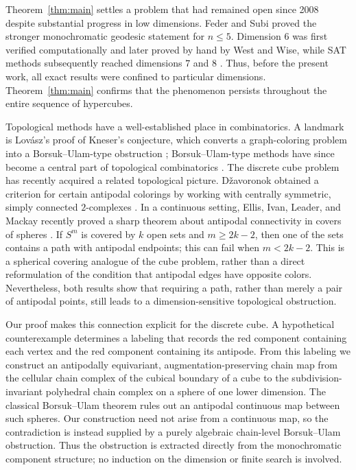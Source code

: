 \documentclass[reqno,12pt]{amsart}
\theoremstyle{definition}
\begin{document}
Theorem~\ref{thm:main} settles a problem that had remained open since
2008 despite substantial progress in low dimensions.  Feder and Subi
proved the stronger monochromatic geodesic statement for \(n\leq5\).
Dimension \(6\) was first verified computationally and later proved by
hand by West and Wise, while SAT methods subsequently reached
dimensions \(7\) and \(8\)
\cite{FederSubi,ZulkoskiEtAl,WestWise,FrankstonScheinerman,
KirchwegerEtAl}.  Thus, before the present work, all exact results were
confined to particular dimensions.  Theorem~\ref{thm:main} confirms
that the phenomenon persists throughout the entire sequence of
hypercubes.

Topological methods have a well-established place in combinatorics.  A
landmark is Lov\'asz's proof of Kneser's conjecture, which converts a
graph-coloring problem into a Borsuk--Ulam-type obstruction
\cite{Lovasz}; Borsuk--Ulam-type methods have since become a central
part of topological combinatorics \cite{Bjorner,Matousek}.  The
discrete cube problem has recently acquired a related topological
picture.  D\v{z}avoronok obtained a criterion for certain
antipodal colorings by working with centrally symmetric, simply
connected \(2\)-complexes \cite{Dzavoronok}.  In a continuous setting,
Ellis, Ivan, Leader, and Mackay recently proved a sharp theorem about
antipodal connectivity in covers of spheres \cite{EllisEtAl}.  If
\(S^m\) is covered by \(k\) open sets and \(m\geq2k-2\), then one of
the sets contains a path with antipodal endpoints; this can fail when
\(m<2k-2\).  This is a spherical covering analogue of the cube
problem, rather than a direct reformulation of the condition that
antipodal edges have opposite colors.  Nevertheless, both results
show that requiring a path, rather than merely a pair of antipodal
points, still leads to a dimension-sensitive topological obstruction.

Our proof makes this connection explicit for the discrete cube.  A
hypothetical counterexample determines a labeling that records the red
component containing each vertex and the red component containing its
antipode.  From this labeling we construct an antipodally equivariant,
augmentation-preserving chain map from the cellular chain complex of
the cubical boundary of a cube to the subdivision-invariant
polyhedral chain complex on a sphere of one lower dimension.  The
classical
Borsuk--Ulam theorem \cite{Borsuk,Matousek} rules out an antipodal
continuous map between such spheres.  Our construction need not arise
from a continuous map, so the contradiction is instead supplied by a
purely algebraic chain-level Borsuk--Ulam obstruction.  Thus the
obstruction is extracted directly from the monochromatic component
structure; no induction on the dimension or finite search is involved.
\end{document}

